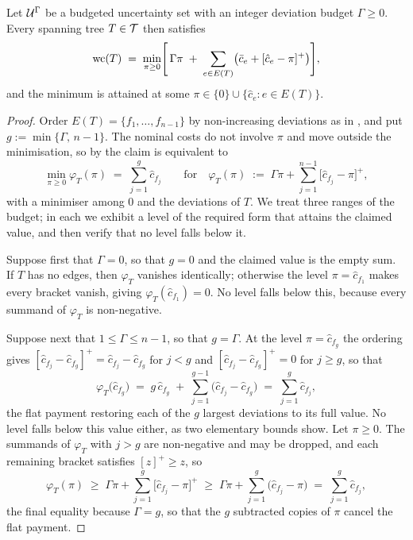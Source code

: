 \begin{lemma}\label{lem:budgeted-threshold-form}
Let $\mathcal{U}^{\Gamma}$ be a budgeted uncertainty set with an integer deviation budget $\Gamma \geq 0$.
Every spanning tree $T \in \mathcal{T}$ then satisfies
\[
\mathrm{wc}(T) \;=\; \min_{\pi \geq 0} \Biggl[\, \Gamma\pi \;+\; \sum_{e \in E(T)} \bigl( \bar{c}_e + [\hat{c}_e - \pi]^{+} \bigr) \Biggr],
\]
and the minimum is attained at some $\pi \in \{0\} \cup \{\hat{c}_e : e \in E(T)\}$.
\end{lemma}

\begin{proof}
Order $E(T) = \{f_1, \ldots, f_{n-1}\}$ by non-increasing deviations as in , and put $g := \min\{\Gamma,\, n-1\}$.
The nominal costs do not involve $\pi$ and move outside the minimisation, so by  the claim is equivalent to
\[
\min_{\pi \geq 0} \varphi_T(\pi) \;=\; \sum_{j=1}^{g} \hat{c}_{f_j}
\qquad \text{for} \quad
\varphi_T(\pi) \;:=\; \Gamma\pi + \sum_{j=1}^{n-1} \bigl[\hat{c}_{f_j} - \pi\bigr]^{+},
\]
with a minimiser among $0$ and the deviations of $T$.
We treat three ranges of the budget; in each we exhibit a level of the required form that attains the claimed value, and then verify that no level falls below it.

Suppose first that $\Gamma = 0$, so that $g = 0$ and the claimed value is the empty sum.
If $T$ has no edges, then $\varphi_T$ vanishes identically; otherwise the level $\pi = \hat{c}_{f_1}$ makes every bracket vanish, giving $\varphi_T(\hat{c}_{f_1}) = 0$.
No level falls below this, because every summand of $\varphi_T$ is non-negative.

Suppose next that $1 \leq \Gamma \leq n-1$, so that $g = \Gamma$.
At the level $\pi = \hat{c}_{f_g}$ the ordering gives $[\hat{c}_{f_j} - \hat{c}_{f_g}]^{+} = \hat{c}_{f_j} - \hat{c}_{f_g}$ for $j < g$ and $[\hat{c}_{f_j} - \hat{c}_{f_g}]^{+} = 0$ for $j \geq g$, so that
\[
\varphi_T\bigl(\hat{c}_{f_g}\bigr) \;=\; g\, \hat{c}_{f_g} \;+\; \sum_{j=1}^{g-1} \bigl( \hat{c}_{f_j} - \hat{c}_{f_g} \bigr) \;=\; \sum_{j=1}^{g} \hat{c}_{f_j},
\]
the flat payment restoring each of the $g$ largest deviations to its full value.
No level falls below this value either, as two elementary bounds show.
Let $\pi \geq 0$.
The summands of $\varphi_T$ with $j > g$ are non-negative and may be dropped, and each remaining bracket satisfies $[z]^{+} \geq z$, so
\[
\varphi_T(\pi) \;\geq\; \Gamma\pi + \sum_{j=1}^{g} \bigl[\hat{c}_{f_j} - \pi\bigr]^{+}
\;\geq\; \Gamma\pi + \sum_{j=1}^{g} \bigl(\hat{c}_{f_j} - \pi\bigr)
\;=\; \sum_{j=1}^{g} \hat{c}_{f_j},
\]
the final equality because $\Gamma = g$, so that the $g$ subtracted copies of $\pi$ cancel the flat payment.


\end{proof}
